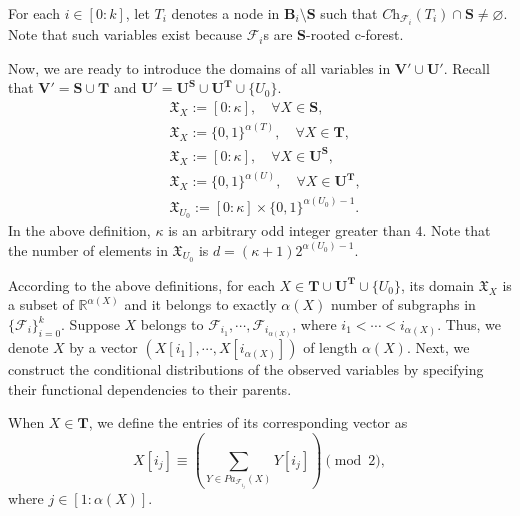 \documentclass[accepted]{uai2022}
\newcommand{\Pa}[2]{\textit{Pa}_{#2}(#1)}
\newcommand{\Ch}[2]{\textit{Ch}_{#2}(#1)}
\newcommand{\V}[0]{\mathbf{V}}
\newcommand{\U}[0]{\mathbf{U}}
\newcommand{\B}[0]{\mathbf{B}}
\newcommand{\T}[0]{\mathbf{T}}
\newcommand{\F}[0]{\mathcal{F}}
\newcommand{\dom}[1]{\mathfrak{X}_{#1}}
\begin{document}
    For each $i\in [0:k]$, let $T_i$ denotes a node in $\B_i \setminus \mathbf{S}$ such that $\Ch{T_i}{\mathcal{F}_i} \cap \mathbf{S} \neq \varnothing$. 
    Note that such variables exist because $\mathcal{F}_i$s are $\mathbf{S}$-rooted c-forest. 

    Now, we are ready to introduce the domains of all variables in $\V'\cup\U'$. Recall that $\V'=\textbf{S}\cup\T$ and $\U'=\U^{\mathbf{S}} \cup \U^{\T} \cup \{U_0\}$.
    \begin{align*}
        &\dom{X} := [0:\kappa], \quad \forall X \in \mathbf{S},\\
        &\dom{X} := \{0, 1\}^{\alpha(T)}, \quad \forall X \in \mathbf{T},\\
        &\dom{X} := [0:\kappa], \quad \forall X \in \U^{\mathbf{S}},\\
        &\dom{X} := \{0, 1\}^{\alpha(U)}, \quad \forall X \in \mathbf{U}^{\T},\\
        &\dom{U_0} := [0:\kappa]\times\{0, 1\}^{\alpha(U_0)-1}.
    \end{align*}
    In the above definition, $\kappa$ is an arbitrary odd integer greater than $4$. 
    Note that the number of elements in $\dom{U_0}$ is $d=(\kappa+1)2^{\alpha(U_0)-1}$.

    According to the above definitions, for each $X\in \T\cup\U^{\T}\cup \{U_0\}$, its domain $\dom{X}$ is a subset of  $\mathbb{R}^{\alpha(X)}$ and it belongs to exactly $\alpha(X)$ number of subgraphs in $\{\F_i\}_{i=0}^k$.
    Suppose $X$ belongs to $\F_{i_1},\cdots, \F_{i_{\alpha(X)}}$, where $i_1 < \cdots < i_{\alpha(X)}$.
    Thus, we denote $X$ by a vector $ (X[i_1],\cdots,X[i_{\alpha(X)}])$ of length $\alpha(X)$. Next, we construct the conditional distributions of the observed variables by specifying their functional dependencies to their parents.
        
    When $X\in \T$, we define the entries of its corresponding vector as
    \begin{equation*}
        X[i_j] \equiv \left(\sum_{Y \in \Pa{X}{\F_{i_j}}} Y[i_j]\right) \pmod{2},
    \end{equation*}
    where $j\in[1:\alpha(X)]$.
    
\end{document}

